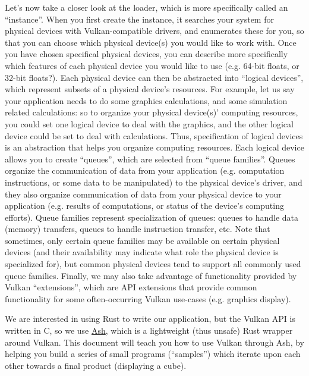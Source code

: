 \documentclass[12pt,letterpaper]{article}
\newcommand{\inquotes}[1]{``#1''}	%
\begin{document}
Let's now take a closer look at the loader, which is more specifically called an \inquotes{instance}. When you first create the instance, it searches your system for physical devices with Vulkan-compatible drivers, and enumerates these for you, so that you can choose which physical device(s) you would like to work with. Once you have chosen specifical physical devices, you can describe more specifically which features of each physical device you would like to use (e.g. 64-bit floats, or 32-bit floats?). Each physical device can then be abstracted into \inquotes{logical devices}, which represent subsets of a physical device's resources. For example, let us say your application needs to do some graphics calculations, and some simulation related calculations: so to organize your physical device(s)' computing resources, you could set one logical device to deal with the graphics, and the other logical device could be set to deal with calculations. Thus, specification of logical devices is an abstraction that helps you organize computing resources. Each logical device allows you to create \inquotes{queues}, which are selected from \inquotes{queue families}. Queues organize the communication of data from your application (e.g. computation instructions, or some data to be manipulated) to the physical device's driver, and they also organize communication of data from your physical device to your application (e.g. results of computations, or status of the device's computing efforts). Queue families represent specialization of queues: queues to handle data (memory) transfers, queues to handle instruction transfer, etc. Note that sometimes, only certain queue families may be available on certain physical devices (and their availability may indicate what role the physical device is specialized for), but common physical devices tend to support all commonly used queue families. Finally, we may also take advantage of functionality provided by Vulkan \inquotes{extensions}, which are API extensions that provide common functionality for some often-occurring Vulkan use-cases (e.g. graphics display).

We are interested in using Rust to write our application, but the Vulkan API is written in C, so we use \href{https://github.com/MaikKlein/ash}{Ash}, which is a lightweight (thus unsafe) Rust wrapper around Vulkan. This document will teach you how to use Vulkan through Ash, by helping you build a series of small programs (\inquotes{samples}) which iterate upon each other towards a final product (displaying a cube). 
\end{document}
